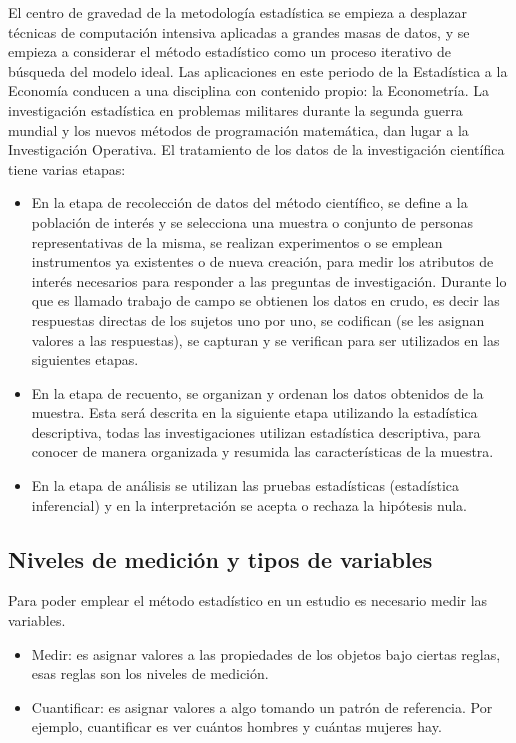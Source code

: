 \documentclass[a4paper]{report} %
\begin{document}
El centro de gravedad de la metodolog\'ia estad\'istica se empieza a desplazar t\'ecnicas de computaci\'on intensiva aplicadas a grandes masas de datos, y se empieza a considerar el m\'etodo estad\'istico como un proceso iterativo de b\'usqueda del modelo ideal. Las aplicaciones en este periodo de la Estad\'istica a la Econom\'ia conducen a una disciplina con contenido propio: la Econometr\'ia. La investigaci\'on estad\'istica en problemas militares durante la segunda guerra mundial y los nuevos m\'etodos de programaci\'on matem\'atica, dan lugar a la Investigaci\'on Operativa. El tratamiento de los datos de la investigaci\'on cient\'ifica tiene varias etapas:

\begin{itemize}
    \item En la etapa de recolecci\'on de datos del m\'etodo cient\'ifico, se define a la poblaci\'on de inter\'es y se selecciona una muestra o conjunto de personas representativas de la misma, se realizan experimentos o se emplean instrumentos ya existentes o de nueva creaci\'on, para medir los atributos de inter\'es necesarios para responder a las preguntas de investigaci\'on. Durante lo que es llamado trabajo de campo se obtienen los datos en crudo, es decir las respuestas directas de los sujetos uno por uno, se codifican (se les asignan valores a las respuestas), se capturan y se verifican para ser utilizados en las siguientes etapas.
    \item En la etapa de recuento, se organizan y ordenan los datos obtenidos de la muestra. Esta ser\'a descrita en la siguiente etapa utilizando la estad\'istica descriptiva, todas las investigaciones utilizan estad\'istica descriptiva, para conocer de manera organizada y resumida las caracter\'isticas de la muestra.
    \item En la etapa de an\'alisis se utilizan las pruebas estad\'isticas (estad\'istica inferencial) y en la interpretaci\'on se acepta o rechaza la hip\'otesis nula.
\end{itemize}
\subsection*{Niveles de medici\'on y tipos de variables}
Para poder emplear el m\'etodo estad\'istico en un estudio es necesario medir las variables. 

\begin{itemize}
    \item Medir: es asignar valores a las propiedades de los objetos bajo ciertas reglas, esas reglas son los niveles de medici\'on.
    \item Cuantificar: es asignar valores a algo tomando un patr\'on de referencia. Por ejemplo, cuantificar es ver cu\'antos hombres y cu\'antas mujeres hay.
\end{itemize}
\end{document}
